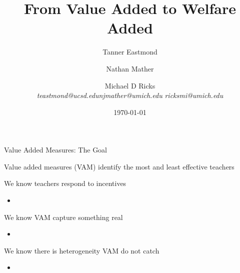 \documentclass[t,aspectratio=169,11pt]{beamer}
\title{From Value Added to Welfare Added}
\author{Tanner Eastmond \hfill \and Nathan Mather   \and \hfill Michael D Ricks   \\   \textit{teastmond@ucsd.edu}\hfill \textit{njmather{\fontfamily{qag}\selectfont @}umich.edu} \hfill
\textit{ricksmi{\fontfamily{qag}\selectfont @}umich.edu} }
\institute{}
\date{\today}
\newenvironment{wideitemize}{\itemize\addtolength{\itemsep}{14pt}}{\enditemize}
\begin{document}
\begin{frame}[noframenumbering]
\titlepage 
\end{frame}


\begin{frame}{Value Added Measures: The Goal}
\begin{wideitemize}
    \item Value added measures (VAM) identify the most and least effective teachers
    \item We know teachers respond to incentives
    \begin{itemize}
        \item {}
    \end{itemize}
    \item We know VAM capture something real
    \begin{itemize}
        \item {}
    \end{itemize}
    \item We know there is heterogeneity VAM do not catch
    \begin{itemize}
        \item {}
    \end{itemize}
\end{wideitemize}

\end{frame}
\end{document}
